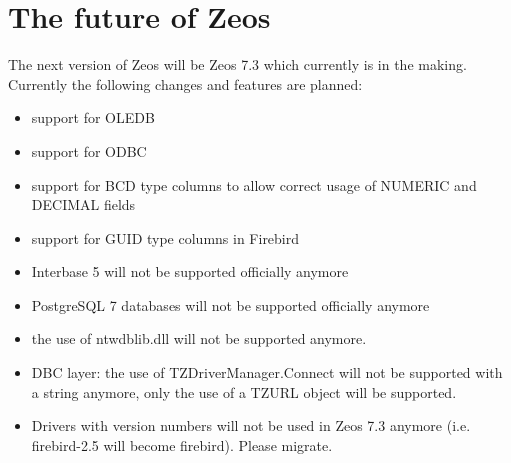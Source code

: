 \documentclass[a4paper,12pt,oneside]{article}
\begin{document}
\section{The future of Zeos}
The next version of Zeos will be Zeos 7.3 which currently is in the making.
Currently the following changes and features are planned:
\begin{itemize}
\item support for OLEDB
\item support for ODBC
\item support for BCD type columns to allow correct usage of NUMERIC and DECIMAL fields
\item support for GUID type columns in Firebird
\item Interbase 5 will not be supported officially anymore
\item PostgreSQL 7 databases will not be supported officially anymore
\item the use of ntwdblib.dll will not be supported anymore.
\item DBC layer: the use of TZDriverManager.Connect will not be supported with a string anymore, only the use of a TZURL object will be supported.
\item
  Drivers with version numbers will not be used in Zeos 7.3 anymore (i.e. firebird-2.5 will become firebird).
  Please migrate.
\end{itemize}
\end{document}
